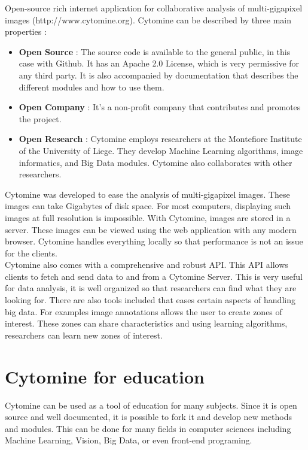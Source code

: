 \documentclass[a4paper,11pt]{report}
\numberwithin{figure}{chapter} %
\begin{document}
Open-source rich internet application for collaborative analysis of multi-gigapixel images (http://www.cytomine.org).
Cytomine can be described by three main properties :
\begin{itemize}
\item[\textbullet] \textbf{Open Source} : The source code is available to the general public, in this case with Github.
It has an Apache 2.0 License, which is very permissive for any third party.
It is also accompanied by documentation that describes the different modules and how to use them.
\item[\textbullet] \textbf{Open Company} : It's a non-profit company that contributes and promotes the project.
\item[\textbullet] \textbf{Open Research} : Cytomine employs researchers at the Montefiore Institute of the University of Liege.
They develop Machine Learning algorithms, image informatics, and Big Data modules.
Cytomine also collaborates with other researchers.
\end{itemize}

Cytomine was developed to ease the analysis of multi-gigapixel images.
These images can take Gigabytes of disk space.
For most computers, displaying such images at full resolution is impossible.
With Cytomine, images are stored in a server.
These images can be viewed using the web application with any modern browser.
Cytomine handles everything locally so that performance is not an issue for the clients.\\

	Cytomine also comes with a comprehensive and robust API.
	This API allows clients to fetch and send data to and from a Cytomine Server.
	This is very useful for data analysis, it is well organized so that researchers can find what they are looking for.
	There are also tools included that eases certain aspects of handling big data.
	For examples image annotations allows the user to create zones of interest.
	These zones can share characteristics and using learning algorithms, researchers can learn new zones of interest.

\section{Cytomine for education}

Cytomine can be used as a tool of education for many subjects.
Since it is open source and well documented, it is possible to fork it and develop new methods and modules.
This can be done for many fields in computer sciences including Machine Learning, Vision, Big Data, or even front-end programing.\\
\end{document}
